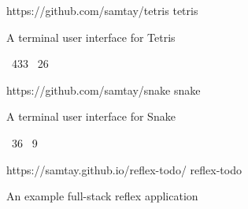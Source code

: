 \vspace{0.25em}
\begin{cvprojects}
  \cvproject
    {https://github.com/samtay/tetris}
    {tetris}
    {\begin{cvitems}
        \item A terminal user interface for Tetris
        \item {\color{graytext} \faStarO \, 433 \; \faCodeFork \, 26}
     \end{cvitems}}
  \cvproject
    {https://github.com/samtay/snake}
    {snake}
    {\begin{cvitems}
        \item A terminal user interface for Snake
        \item {\color{graytext} \faStarO \, 36 \; \faCodeFork \, 9}
     \end{cvitems}}
  \cvproject
    {https://samtay.github.io/reflex-todo/}
    {reflex-todo}
    {\begin{cvitems}
        \item An example full-stack reflex application
     \end{cvitems}}
\end{cvprojects}
